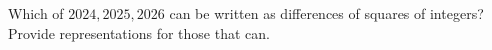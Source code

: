 Which of $2024,2025,2026$ can be written as differences of squares of integers? Provide representations for those that can.
